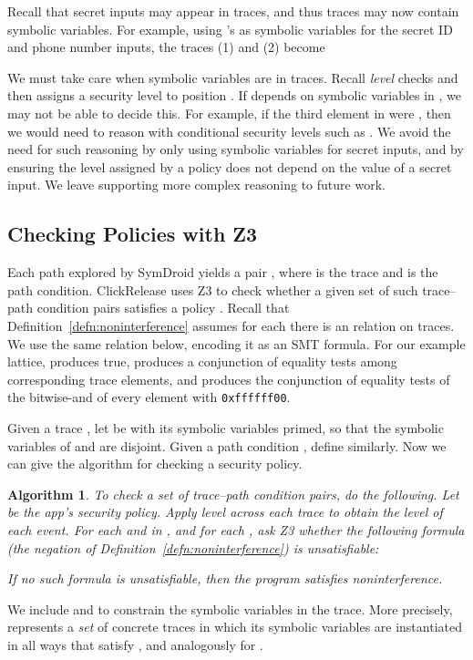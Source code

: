 \documentclass{llncs}
\newcommand{\code}[1]{\textsf{#1}} \newcommand{\bcode}[1]{\texttt{#1}}
\newtheorem{algorithm}{Algorithm}
\newcommand{\toolname}{ClickRelease\xspace}
\begin{document}
Recall that secret inputs may appear in traces, and thus traces may
now contain symbolic variables. For example, using 's as
symbolic variables for the secret ID and phone number inputs, the
traces (1) and (2) become



We must take care when symbolic variables are in traces.
Recall \textit{level} checks  and
then assigns a security level to position . If 
depends on symbolic variables in , we may not be able to
decide this. For example, if the third element in  were
, then we would need to reason with
conditional security levels such as
. We
avoid the need for such reasoning by only using symbolic variables for
secret inputs, and by ensuring the level assigned by a policy does not
depend on the value of a secret input. We leave supporting more complex
reasoning to future work.

\subsection{Checking Policies with Z3}

Each path explored by SymDroid yields a pair , where  is
the trace and  is the path condition. \toolname{} uses Z3 to check whether a given set
of such trace--path condition pairs satisfies a policy . Recall that
Definition~\ref{defn:noninterference} assumes for each  there is an
 relation on traces. We use the same relation below, encoding it
as an SMT formula. For our example lattice,  produces
\code{true},  produces a conjunction of equality tests
among corresponding trace elements, and 
produces the conjunction of equality tests of the bitwise-and of every
element with \bcode{0xffffff00}.

Given a trace
, let  be  with its symbolic variables primed, so that the
symbolic variables of  and  are disjoint. Given a path
condition , define  similarly. Now we can give the
algorithm for checking a security policy.

\begin{algorithm}
  To check a set  of trace--path condition pairs, do the
  following. Let  be the app's security policy. Apply \emph{level}
  across each trace to obtain the level of each event.  For each
   and  in , and for
  each , ask Z3 whether the following formula (the negation of
  Definition~\ref{defn:noninterference}) is unsatisfiable:
  
  If no such formula is unsatisfiable, then the program satisfies noninterference.
\end{algorithm}
We include  and  to
constrain the symbolic variables in the trace. More precisely,
 represents a \emph{set} of concrete traces in which its symbolic
variables are instantiated in all ways that satisfy ,
and analogously for .
\end{document}

